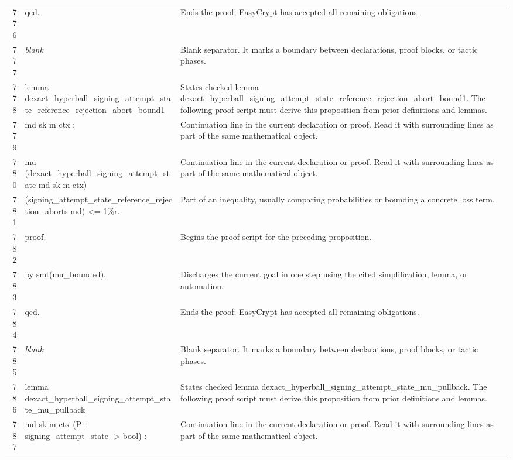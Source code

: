 \documentclass[10pt]{article}
\begin{document}
\begin{longtable}{r L{0.53\textwidth} L{0.37\textwidth}}
776 & {\ttfamily\scriptsize qed.} & Ends the proof; EasyCrypt has accepted all remaining obligations. \\
777 & {\ttfamily\scriptsize \emph{blank}} & Blank separator.  It marks a boundary between declarations, proof blocks, or tactic phases. \\
778 & {\ttfamily\scriptsize lemma dexact\_hyperball\_signing\_attempt\_state\_reference\_rejection\_abort\_bound1} & States checked lemma dexact\_hyperball\_signing\_attempt\_state\_reference\_rejection\_abort\_bound1.  The following proof script must derive this proposition from prior definitions and lemmas. \\
779 & {\ttfamily\scriptsize   md sk m ctx :} & Continuation line in the current declaration or proof.  Read it with surrounding lines as part of the same mathematical object. \\
780 & {\ttfamily\scriptsize   mu (dexact\_hyperball\_signing\_attempt\_state md sk m ctx)} & Continuation line in the current declaration or proof.  Read it with surrounding lines as part of the same mathematical object. \\
781 & {\ttfamily\scriptsize     (signing\_attempt\_state\_reference\_rejection\_aborts md) <= 1\%r.} & Part of an inequality, usually comparing probabilities or bounding a concrete loss term. \\
782 & {\ttfamily\scriptsize proof.} & Begins the proof script for the preceding proposition. \\
783 & {\ttfamily\scriptsize by smt(mu\_bounded).} & Discharges the current goal in one step using the cited simplification, lemma, or automation. \\
784 & {\ttfamily\scriptsize qed.} & Ends the proof; EasyCrypt has accepted all remaining obligations. \\
785 & {\ttfamily\scriptsize \emph{blank}} & Blank separator.  It marks a boundary between declarations, proof blocks, or tactic phases. \\
786 & {\ttfamily\scriptsize lemma dexact\_hyperball\_signing\_attempt\_state\_mu\_pullback} & States checked lemma dexact\_hyperball\_signing\_attempt\_state\_mu\_pullback.  The following proof script must derive this proposition from prior definitions and lemmas. \\
787 & {\ttfamily\scriptsize   md sk m ctx (P : signing\_attempt\_state -> bool) :} & Continuation line in the current declaration or proof.  Read it with surrounding lines as part of the same mathematical object. \\

\end{longtable}
\end{document}
